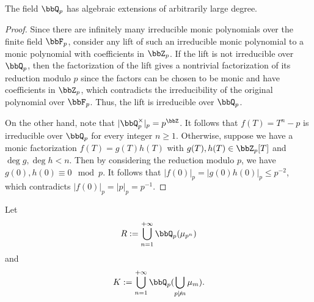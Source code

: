     \begin{proposition}\label{prop:irreducible_polynomial_over_Q_p}
        The field \(\bbQ_p\) has algebraic extensions of arbitrarily large degree.
    \end{proposition}
    \begin{proof}
        Since there are infinitely many irreducible monic polynomials over the finite field \(\bbF_p\), 
        consider any lift of such an irreducible monic polynomial to a monic polynomial with coefficients in \(\bbZ_p\).
        If the lift is not irreducible over \(\bbQ_p\), 
        then the factorization of the lift gives a nontrivial factorization of its reduction modulo \(p\) since the factors can be chosen to be monic and have coefficients in \(\bbZ_p\), 
        which contradicts the irreducibility of the original polynomial over \(\bbF_p\).
        Thus, the lift is irreducible over \(\bbQ_p\).

        On the other hand, note that \(|\bbQ_p^\times|_p = p^\bbZ\).
        It follows that \(f(T) = T^n - p\) is irreducible over \(\bbQ_p\) for every integer \(n \geq 1\).
        Otherwise, suppose we have a monic factorization \(f(T) = g(T) h(T)\) with \(g(T), h(T) \in \bbZ_p[T]\) and \(\deg g, \deg h < n\). 
        Then by considering the reduction modulo \(p\), we have \(g(0), h(0) \equiv 0 \mod p\).
        It follows that \(|f(0)|_p = |g(0) h(0)|_p \leq p^{-2}\), which contradicts \(|f(0)|_p = |p|_p = p^{-1}\).
    \end{proof}

    Let 
    \[ R := \bigcup_{n=1}^{+\infty} \bbQ_p(\mu_{p^n}) \]
    and 
    \[ K := \bigcup_{n=1}^{+\infty} \bbQ_p(\bigcup_{p\not\mid m} \mu_{m}). \]



